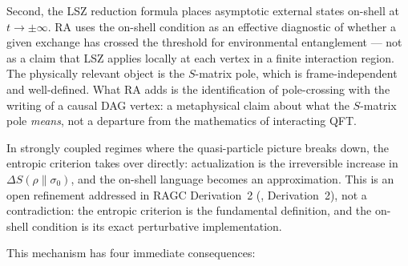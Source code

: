 \documentclass[11pt,a4paper]{article}
\theoremstyle{plain}
\theoremstyle{definition}
\theoremstyle{remark}
\begin{document}
Second, the LSZ reduction formula places asymptotic external states on-shell
at $t \to \pm\infty$. RA uses the on-shell condition as an effective diagnostic
of whether a given exchange has crossed the threshold for environmental
entanglement --- not as a claim that LSZ applies locally at each vertex in a
finite interaction region. The physically relevant object is the $S$-matrix
pole, which is frame-independent and well-defined. What RA adds is the
identification of pole-crossing with the writing of a causal DAG vertex: a
metaphysical claim about what the $S$-matrix pole \emph{means}, not a departure
from the mathematics of interacting QFT.

In strongly coupled regimes where the quasi-particle picture breaks down, the
entropic criterion takes over directly: actualization is the irreversible
increase in $\Delta S(\rho \| \sigma_0)$, and the on-shell language becomes an
approximation. This is an open refinement addressed in RAGC
Derivation~2 (\citep{Sandeman2026RAGC}, Derivation~2),
not a contradiction: the entropic criterion is the fundamental definition,
and the on-shell condition is its exact perturbative implementation.

This mechanism has four immediate consequences:
\end{document}
